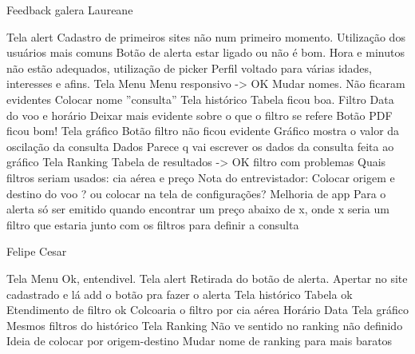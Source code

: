 Feedback galera
Laureane
	
	Tela alert
		Cadastro de primeiros sites não num primeiro momento.
			Utilização dos usuários mais comuns
		Botão de alerta estar ligado ou não é bom.
		Hora e minutos não estão adequados, utilização de picker
		Perfil voltado para várias idades, interesses e afins.
	Tela Menu
		Menu responsivo -> OK
		Mudar nomes. Não ficaram evidentes
		Colocar nome ''consulta''
	Tela histórico
		Tabela ficou boa.
		Filtro
			Data do voo e horário
			Deixar mais evidente sobre o que o filtro se refere
		Botão PDF ficou bom!
	Tela gráfico
		Botão filtro não ficou evidente
		Gráfico mostra o valor da oscilação da consulta
		Dados 
			Parece q vai escrever os dados da consulta feita ao gráfico
	Tela Ranking
		Tabela de resultados -> OK
		filtro com problemas
			Quais filtros seriam usados: cia aérea e preço
		Nota do entrevistador:
			Colocar origem e destino do voo ? ou colocar na tela de configurações?
	Melhoria de app
		Para o alerta só ser emitido quando encontrar um preço abaixo de x, onde x seria um filtro que estaria junto com os filtros para definir a consulta

Felipe Cesar
	
	Tela Menu
		Ok, entendivel.
	Tela alert
		Retirada do botão de alerta.
			Apertar no site cadastrado e lá add o botão pra fazer o alerta
	Tela histórico
		Tabela ok
		Etendimento de filtro ok
			Colcoaria o filtro por 
				cia aérea
				Horário
				Data
	Tela gráfico
		Mesmos filtros do histórico
	Tela Ranking
		Não ve sentido no ranking não definido
		Ideia de colocar por origem-destino
		Mudar nome de ranking para mais baratos
